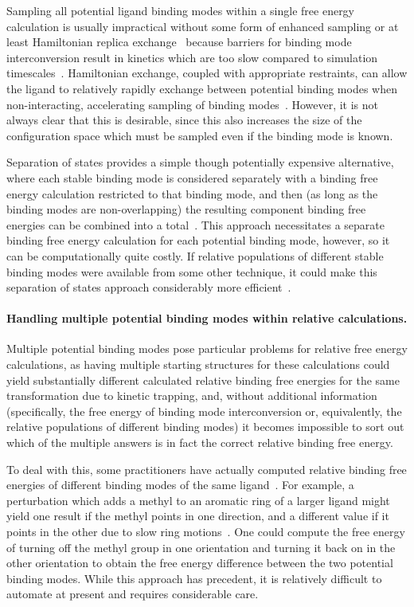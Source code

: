 \documentclass[9pt,bestpractices]{livecoms}
\begin{document}
Sampling all potential ligand binding modes within a single free energy calculation is usually impractical without some form of enhanced sampling or at least Hamiltonian replica exchange~\cite{wang2013identifying} because barriers for binding mode interconversion result in kinetics which are too slow compared to simulation timescales~\cite{mobley2006use, palma2012computation,mobley2012perspective, gill2018binding}.
Hamiltonian exchange, coupled with appropriate restraints, can allow the ligand to relatively rapidly exchange between potential binding modes when non-interacting, accelerating sampling of binding modes~\cite{wang2013identifying}. However, it is not always clear that this is desirable, since this also increases the size of the configuration space which must be sampled even if the binding mode is known.

Separation of states provides a simple though potentially expensive alternative, where each stable binding mode is considered separately with a binding free energy calculation restricted to that binding mode, and then (as long as the binding modes are non-overlapping) the resulting component binding free energies can be combined into a total~\cite{mobley2006use, mobley2012perspective}.
This approach necessitates a separate binding free energy calculation for each potential binding mode, however, so it can be computationally quite costly.
If relative populations of different stable binding modes were available from some other technique, it could make this separation of states approach considerably more efficient~\cite{mobley2012perspective, gill2018binding}.

\paragraph{Handling multiple potential binding modes within relative calculations.}
Multiple potential binding modes pose particular problems for relative free energy calculations, as having multiple starting structures for these calculations could yield substantially different calculated relative binding free energies for the same transformation due to kinetic trapping, and, without additional information (specifically, the free energy of binding mode interconversion or, equivalently, the relative populations of different binding modes) it becomes impossible to sort out which of the multiple answers is in fact the correct relative binding free energy.

To deal with this, some practitioners have actually computed relative binding free energies of different binding modes of the same ligand~\cite{palma2012computation}.
For example, a perturbation which adds a methyl to an aromatic ring of a larger ligand might yield one result if the methyl points in one direction, and a different value if it points in the other due to slow ring motions~\cite{lincoff2016comparing, sasmal2020sampling}.
One could compute the free energy of turning off the methyl group in one orientation and turning it back on in the other orientation to obtain the free energy difference between the two potential binding modes.
While this approach has precedent, it is relatively difficult to automate at present and requires considerable care.
\end{document}
